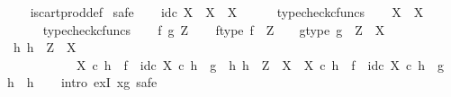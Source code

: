 \begin{isabellebody}
%
\isadelimproof
\ \ %
\endisadelimproof
%
\isatagproof
{}\isamarkupfalse%
\ is{\isacharunderscore}{\kern0pt}cart{\isacharunderscore}{\kern0pt}prod{\isacharunderscore}{\kern0pt}def\isanewline
{}\isamarkupfalse%
\ safe\isanewline
\ \ \isamarkupfalse%
\ {\isachardoublequoteopen}id\isactrlsub c\ X\ {\isacharcolon}{\kern0pt}\ X\ {\isasymrightarrow}\ X{\isachardoublequoteclose}\isanewline
\ \ \ \ \isamarkupfalse%
\ typecheck{\isacharunderscore}{\kern0pt}cfuncs\isanewline
{}\isamarkupfalse%
\isanewline
\ \ \isamarkupfalse%
\ {\isachardoublequoteopen}{\isasymbeta}\isactrlbsub X\isactrlesub \ {\isacharcolon}{\kern0pt}\ X\ {\isasymrightarrow}\ {\isasymone}{\isachardoublequoteclose}\isanewline
\ \ \ \ \isamarkupfalse%
\ typecheck{\isacharunderscore}{\kern0pt}cfuncs\isanewline
{}\isamarkupfalse%
\isanewline
\ \ \isamarkupfalse%
\ f\ g\ Z\isanewline
\ \ \isamarkupfalse%
\ f{\isacharunderscore}{\kern0pt}type{\isacharcolon}{\kern0pt}\ {\isachardoublequoteopen}f\ {\isacharcolon}{\kern0pt}\ Z\ {\isasymrightarrow}\ {\isasymone}{\isachardoublequoteclose}\ \ g{\isacharunderscore}{\kern0pt}type{\isacharcolon}{\kern0pt}\ {\isachardoublequoteopen}g\ {\isacharcolon}{\kern0pt}\ Z\ {\isasymrightarrow}\ X{\isachardoublequoteclose}\isanewline
\ \ \isamarkupfalse%
\ \isamarkupfalse%
\ {\isachardoublequoteopen}{\isasymexists}h{\isachardot}{\kern0pt}\ h\ {\isacharcolon}{\kern0pt}\ Z\ {\isasymrightarrow}\ X\ {\isasymand}\isanewline
\ \ \ \ \ \ \ \ \ \ \ {\isasymbeta}\isactrlbsub X\isactrlesub \ {\isasymcirc}\isactrlsub c\ h\ {\isacharequal}{\kern0pt}\ f\ {\isasymand}\ id\isactrlsub c\ X\ {\isasymcirc}\isactrlsub c\ h\ {\isacharequal}{\kern0pt}\ g\ {\isasymand}\ {\isacharparenleft}{\kern0pt}{\isasymforall}h{}{\isachardot}{\kern0pt}\ h{}\ {\isacharcolon}{\kern0pt}\ Z\ {\isasymrightarrow}\ X\ {\isasymand}\ {\isasymbeta}\isactrlbsub X\isactrlesub \ {\isasymcirc}\isactrlsub c\ h{}\ {\isacharequal}{\kern0pt}\ f\ {\isasymand}\ id\isactrlsub c\ X\ {\isasymcirc}\isactrlsub c\ h{}\ {\isacharequal}{\kern0pt}\ g\ {\isasymlongrightarrow}\ h{}\ {\isacharequal}{\kern0pt}\ h{\isacharparenright}{\kern0pt}{\isachardoublequoteclose}\isanewline
\ \ \isamarkupfalse%
\ {\isacharparenleft}{\kern0pt}intro\ exI{\isacharbrackleft}{\kern0pt}\ x{\isacharequal}{\kern0pt}g{\isacharbrackright}{\kern0pt}{\isacharcomma}{\kern0pt}\ safe{\isacharparenright}{\kern0pt}\isanewline

\end{isabellebody}
